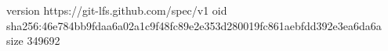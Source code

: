 version https://git-lfs.github.com/spec/v1
oid sha256:46e784bb9fdaa6a02a1c9f48fc89e2e353d280019fc861aebfdd392e3ea6da6a
size 349692
